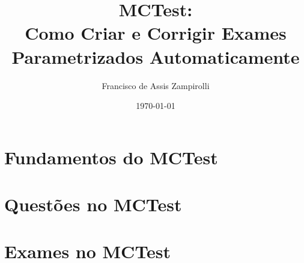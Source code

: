 
\frontmatter
\title{MCTest:\\
Como Criar e Corrigir Exames Parametrizados Automaticamente}
\author{Francisco de Assis Zampirolli}

\date{\today}


\maketitle
\cleardoublepage
\cleardoublepage
\cleardoublepage
\cleardoublepage
\frontmatter

\setcounter{page}{11}
\tableofcontents\cleardoublepage
\listoffigures\cleardoublepage
{}
\listoflistings
\cleardoublepage

\mainmatter

\cleardoublepage

\part{Fundamentos do MCTest}\label{part:fundamentos}\cleardoublepage
\cleardoublepage
\cleardoublepage

\part{Questões no MCTest}\label{part:questoesMCTest}\cleardoublepage
\cleardoublepage
\cleardoublepage

\part{Exames no MCTest}\label{part:exames}\cleardoublepage
\cleardoublepage
\cleardoublepage
\cleardoublepage
\cleardoublepage
\cleardoublepage

